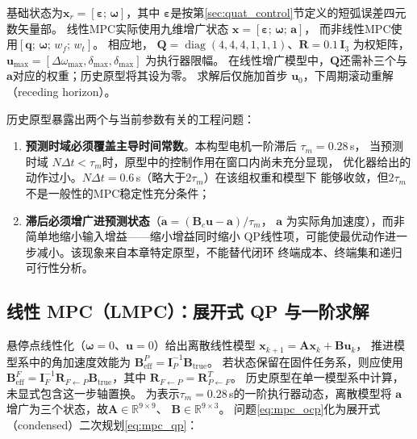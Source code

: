 基础状态为$\mathbf{x}_r=[\boldsymbol{\varepsilon};\,\boldsymbol{\omega}]$，其中
$\boldsymbol{\varepsilon}$是按第\ref{sec:quat_control}节定义的短弧误差四元数矢量部。
线性MPC实际使用九维增广状态
$\mathbf{x}=[\boldsymbol{\varepsilon};\,\boldsymbol{\omega};\,\boldsymbol{a}]$，
而非线性MPC使用$[\mathbf q;\,\boldsymbol\omega;\,w_f;\,w_t]$。
相应地，
$\mathbf{Q}=\operatorname{diag}(4,4,4,1,1,1)$、$\mathbf{R}=0.1\,\mathbf{I}_3$ 为权矩阵，
$\mathbf{u}_{\max}=[\Delta\omega_{\max}, \delta_{\max}, \delta_{\max}]$ 为执行器限幅。
在线性增广模型中，$\mathbf Q$还需补三个与$\boldsymbol a$对应的权重；历史原型将其设为零。
求解后仅施加首步 $\mathbf{u}_0$，下周期滚动重解（receding horizon）。

历史原型暴露出两个与当前参数有关的工程问题：
\begin{enumerate}
    \item \textbf{预测时域必须覆盖主导时间常数}。本构型电机一阶滞后 $\tau_m=0.28$\,s，
          当预测时域 $N\Delta t < \tau_m$时，原型中的控制作用在窗口内尚未充分显现，
          优化器给出的动作过小。$N\Delta t=0.6$\,s（略大于$2\tau_m$）在该组权重和模型下
          能够收敛，但$2\tau_m$不是一般性的MPC稳定性充分条件；
    \item \textbf{滞后必须增广进预测状态}（$\dot{\boldsymbol{a}} = (\mathbf{B}_c\mathbf{u}-\boldsymbol{a})/\tau_m$，
          $\boldsymbol{a}$ 为实际角加速度），而非简单地缩小输入增益——缩小增益同时缩小
          QP线性项，可能使最优动作进一步减小。该现象来自本章特定原型，不能替代闭环
          终端成本、终端集和递归可行性分析\cite{mayne2000constrained}。
\end{enumerate}

\subsection{线性 MPC（LMPC）：展开式 QP 与一阶求解}
\label{sec:lmpc}

悬停点线性化（$\boldsymbol{\omega}=0$、$\mathbf{u}=0$）给出离散线性模型
$\mathbf{x}_{k+1} = \mathbf{A}\mathbf{x}_k + \mathbf{B}\mathbf{u}_k$，
推进模型系中的角加速度效能为
$\mathbf B_{\mathrm{eff}}^P=\mathbf I_P^{-1}\mathbf B_{\mathrm{true}}$。
若状态保留在固件任务系，则应使用
$\mathbf B_{\mathrm{eff}}^F=\mathbf I_F^{-1}\mathbf R_{F\leftarrow P}
\mathbf B_{\mathrm{true}}$，其中
$\mathbf R_{F\leftarrow P}=\mathbf R_{P\leftarrow F}^{T}$。
历史原型在单一模型系中计算，未显式包含这一步轴置换。
为表示$\tau_m=0.28$\,s的一阶执行器动态，离散模型将
$\boldsymbol a$增广为三个状态，故$\mathbf A\in\mathbb R^{9\times9}$、
$\mathbf B\in\mathbb R^{9\times3}$。
问题\eqref{eq:mpc_ocp}化为展开式（condensed）二次规划\eqref{eq:mpc_qp}：

